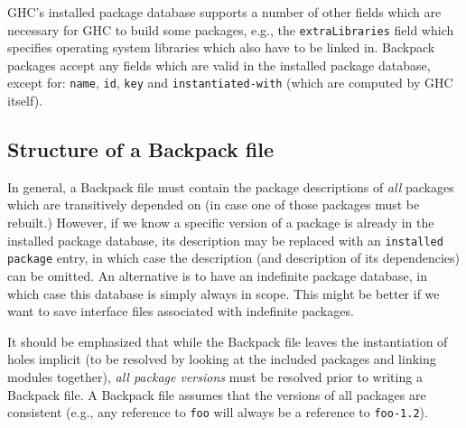 \documentclass{article}
\newcommand{\Red}[1]{{\color{red} #1}}
\begin{document}
GHC's installed package database supports a number of other fields
which are necessary for GHC to build some packages, e.g., the \texttt{extraLibraries}
field which specifies operating system libraries which also have to
be linked in.  Backpack packages accept any fields which are valid in the
installed package database, except for: \texttt{name}, \texttt{id}, \texttt{key}
and \texttt{instantiated-with} (which are computed by GHC itself).

\subsection{Structure of a Backpack file}

In general, a Backpack file must contain the package descriptions of
\emph{all} packages which are transitively depended on (in case
one of those packages must be rebuilt.)  However, if we know a specific
version of a package is already in the installed package database,
its description may be replaced with an \texttt{installed package}
entry, in which case the description (and description of its dependencies)
can be omitted.  \Red{An alternative is to have an indefinite package
database, in which case this database is simply always in scope.  This
might be better if we want to save interface files associated with indefinite
packages.}

It should be emphasized that while the Backpack file leaves the instantiation
of holes implicit (to be resolved by looking at the included packages and
linking modules together), \emph{all package versions} must be resolved
prior to writing a Backpack file.  A Backpack file assumes that the
versions of all packages are consistent (e.g., any reference to \texttt{foo}
will always be a reference to \texttt{foo-1.2}).

\end{document}
